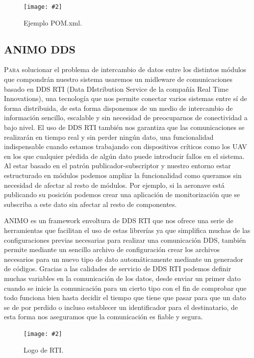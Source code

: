 \documentclass[12pt,a4paper,spanish]{book} %
\newcommand{\imgCentradaMed}[3]{
\begin{figure}[H]
\begin{center}
\texttt{[image: \#2]}
\caption{#3}
\label{#1}
\end{center}
\end{figure}
}
\begin{document}
\imgCentradaMed{fig.2.15}{img/pom.eps}{Ejemplo POM.xml.}
\newpage
\subsection{ANIMO DDS}

\lettrine{P}{ara} solucionar el problema de intercambio de datos entre los distintos módulos que compondrán nuestro sistema usaremos un midleware de comunicaciones basado en DDS RTI (Data DIstribution Service de la compañía Real Time Innovations), una tecnología que nos permite conectar varios sistemas entre sí de forma distribuida, de esta forma disponemos de un medio de intercambio de información sencillo, escalable y sin necesidad de preocuparnos de conectividad a bajo nivel. El uso de DDS RTI también nos garantiza que las comunicaciones se realizarán en tiempo real y sin perder ningún dato, una funcionalidad indispensable cuando estamos trabajando con dispositivos críticos como los UAV en los que cualquier pérdida de algún dato puede introducir fallos en el sistema. Al estar basado en el patrón publicador-subscriptor y nuestro entorno estar estructurado en módulos podemos ampliar la funcionalidad como queramos sin necesidad de afectar al resto de módulos. Por ejemplo, si la aeronave está publicando su posición podemos crear una aplicación de monitorización que se subscriba a este dato sin afectar al resto de componentes.

ANIMO es un framework envoltura de DDS RTI que nos ofrece una serie de herramientas que facilitan el uso de estas librerías ya que simplifica muchas de las configuraciones previas necesarias para realizar una comunicación DDS, también permite mediante un sencillo archivo de configuración crear los archivos necesarios para un nuevo tipo de dato automáticamente mediante un generador de códigos. Gracias a las calidades de servicio de DDS RTI podemos definir muchas variables en la comunicación de los datos, desde enviar un primer dato cuando se inicie la comunicación para un cierto tipo con el fin de comprobar que todo funciona bien hasta decidir el tiempo que tiene que pasar para que un dato se de por perdido o incluso establecer un identificador para el destinatario, de esta forma nos aseguramos que la comunicación es fiable y segura.

\imgCentradaMed{fig.2.16}{img/rti.eps}{Logo de RTI.}

\newpage
\end{document}
